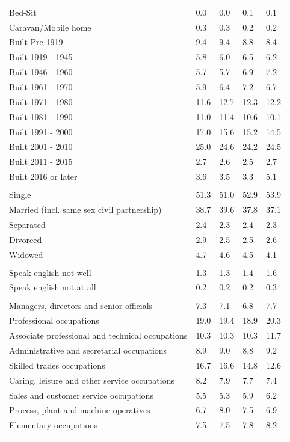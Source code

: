\documentclass{article}
\begin{document}
\begin{table}[h]
\begin{tabular}{KTTTT}
Bed-Sit & 0.0& 0.0& 0.1& 0.1\\
Caravan/Mobile home & 0.3& 0.3& 0.2& 0.2\\
    \hline
Built Pre 1919 & 9.4& 9.4& 8.8& 8.4\\
Built 1919 - 1945 & 5.8& 6.0& 6.5& 6.2\\
Built  1946 - 1960 & 5.7& 5.7& 6.9& 7.2\\
Built  1961 - 1970 & 5.9& 6.4& 7.2& 6.7\\
Built  1971 - 1980 & 11.6& 12.7& 12.3& 12.2\\
Built  1981 - 1990 & 11.0& 11.4& 10.6& 10.1\\
Built  1991 - 2000 & 17.0& 15.6& 15.2& 14.5\\
Built  2001 - 2010 & 25.0& 24.6& 24.2& 24.5\\
Built  2011 - 2015 & 2.7& 2.6& 2.5& 2.7\\
Built  2016 or later & 3.6& 3.5& 3.3& 5.1\\
\hline
    \\
    \hline
Single & 51.3& 51.0& 52.9& 53.9\\
Married (incl. same sex civil partnership) & 38.7& 39.6& 37.8& 37.1\\
Separated  & 2.4& 2.3& 2.4& 2.3\\
Divorced  & 2.9& 2.5& 2.5& 2.6\\
Widowed & 4.7& 4.6& 4.5& 4.1\\
\hline
    \\ 
    \hline
Speak english not well & 1.3& 1.3& 1.4& 1.6\\
Speak english not at all & 0.2& 0.2& 0.2& 0.3\\
\hline
    \\
    \hline
Managers, directors and senior officials & 7.3& 7.1& 6.8& 7.7\\
Professional occupations & 19.0& 19.4& 18.9& 20.3\\
Associate professional and technical occupations & 10.3& 10.3& 10.3& 11.7\\
Administrative and secretarial occupations & 8.9& 9.0& 8.8& 9.2\\
Skilled trades occupations & 16.7& 16.6& 14.8& 12.6\\
Caring, leisure and other service occupations & 8.2& 7.9& 7.7& 7.4\\
Sales and customer service occupations & 5.5& 5.3& 5.9& 6.2\\
Process, plant and machine operatives & 6.7& 8.0& 7.5& 6.9\\
Elementary occupations & 7.5& 7.5& 7.8& 8.2\\
\hline
\end{tabular}
\end{table}
\end{document}
